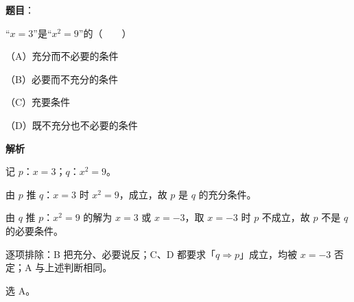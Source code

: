 \begin{answer}

\textbf{题目}：

“$x=3$”是“$x^2=9$”的\mbox{（　　）}

（A）充分而不必要的条件

（B）必要而不充分的条件

（C）充要条件

（D）既不充分也不必要的条件

\textbf{解析}

记 $p$：$x=3$；$q$：$x^2=9$。

由 $p$ 推 $q$：$x=3$ 时 $x^2=9$，成立，故 $p$ 是 $q$ 的充分条件。

由 $q$ 推 $p$：$x^2=9$ 的解为 $x=3$ 或 $x=-3$，取 $x=-3$ 时 $p$ 不成立，故 $p$ 不是 $q$ 的必要条件。

逐项排除：B 把充分、必要说反；C、D 都要求「$q\Rightarrow p$」成立，均被 $x=-3$ 否定；A 与上述判断相同。

选 A。


\end{answer}
